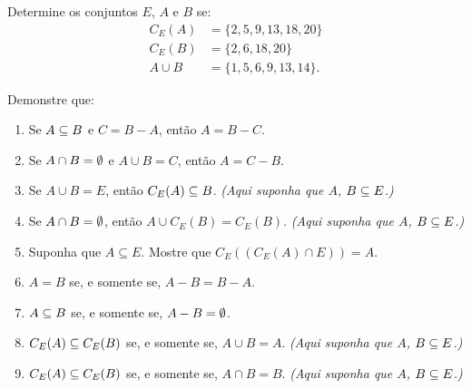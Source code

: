 \documentclass[12pt]{exam}
\begin{document}
    \vspace{.3cm}

    \questao{} Determine os conjuntos $E$, $A$ e $B$ se:
    \begin{align*}
        C_E(A) &= \{2, 5, 9, 13, 18, 20\}\\
        C_E(B) &= \{2, 6, 18, 20\}\\
        A \cup B &= \{1, 5, 6, 9, 13, 14\}.
    \end{align*}

    \vspace{.3cm}

    \questao{} Demonstre que:
    \begin{enumerate}[label={\alph*})]

        \item Se $A \subseteq B$ e $C = B - A$, ent\~ao $A = B - C$.

        \item Se $A \cap B = \emptyset$ e $A \cup B = C$, ent\~ao $A = C - B$.

        \item Se $A\cup B = E$, ent\~ao $C_E(A) \subseteq B$. \textit{(Aqui suponha que $A$,            $B \subseteq E$.)}

        \item Se $A \cap B = \emptyset$, ent\~ao $A \cup C_E(B) = C_E(B)$. \textit{(Aqui suponha que $A$, $B \subseteq E$.)}

        \item Suponha que $A \subseteq E$. Mostre que $C_E((C_E(A) \cap E)) = A$.

        \item $A = B$ se, e somente se, $A - B = B - A$.

        \item $A \subseteq B$ se, e somente se, $A - B = \emptyset$.

        \item $C_E(A) \subseteq C_E(B)$ se, e somente se, $A \cup B = A$. \textit{(Aqui suponha que $A$, $B \subseteq E$.)}

        \item $C_E(A) \subseteq C_E(B)$ se, e somente se, $A \cap B = B$. \textit{(Aqui suponha que $A$, $B \subseteq E$.)}

    \end{enumerate}

    \vspace{.3cm}
\end{document}
